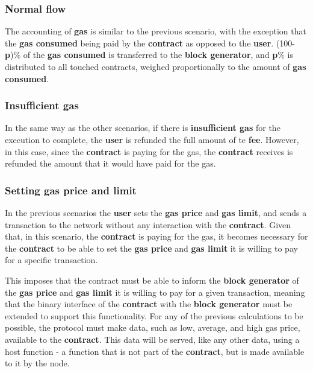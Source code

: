 \documentclass[twocolumn, nofootinbib]{revtex4-2} %
\newcommand{\emphasize}[1]{\textbf{#1}\xspace}
\newcommand{\blockgenerator}{\emphasize{block generator}}
\newcommand{\contract}{\emphasize{contract}}
\newcommand{\fee}{\emphasize{fee}}
\newcommand{\gas}{\emphasize{gas}}
\newcommand{\gasprice}{\emphasize{gas price}}
\newcommand{\gaslimit}{\emphasize{gas limit}}
\newcommand{\gasconsumed}{\emphasize{gas consumed}}
\newcommand{\insufficientgas}{\emphasize{insufficient gas}}
\newcommand{\user}{\emphasize{user}}
\newcommand{\emphp}{\emphasize{p}}
\begin{document}
    \subsubsection*{Normal flow}\label{subsubsec:scenario-3-normal-flow}
    The accounting of \gas is similar to the previous scenario, with the exception
    that the \gasconsumed being paid by the \contract as opposed to the \user.
    (100-\emphp)\% of the \gasconsumed is transferred to the \blockgenerator, and
    \emphp\% is distributed to all touched contracts, weighed proportionally to the
    amount of \gasconsumed.

    \subsubsection*{Insufficient gas}\label{subsubsec:scenario-3-insufficient-gas}
    In the same way as the other scenarios, if there is \insufficientgas for the
    execution to complete, the \user is refunded the full amount of te \fee.
    However, in this case, since the \contract is paying for the gas, the \contract
    receives is refunded the amount that it would have paid for the gas.

    \subsubsection*{Setting gas price and limit}\label{subsubsec:scenario-3-setting-gas-price-and-limit}
    In the previous scenarios the \user sets the \gasprice and \gaslimit, and
    sends a transaction to the network without any interaction with the \contract.
    Given that, in this scenario, the \contract is paying for the gas, it becomes
    necessary for the \contract to be able to set the \gasprice and \gaslimit it
    is willing to pay for a specific transaction.

    This imposes that the contract must be able to inform the \blockgenerator of
    the \gasprice and \gaslimit it is willing to pay for a given transaction,
    meaning that the binary interface of the \contract with the \blockgenerator
    must be extended to support this functionality.
    For any of the previous calculations to be possible, the protocol must make
    data, such as low, average, and high gas price, available to the \contract.
    This data will be served, like any other data, using a host function - a
    function that is not part of the \contract, but is made available to it
    by the node.
\end{document}
